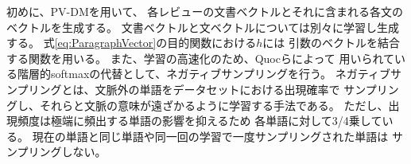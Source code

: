\documentclass{ttithesis}
\begin{document}
初めに、PV-DMを用いて、
各レビューの文書ベクトルとそれに含まれる各文のベクトルを生成する。
文書ベクトルと文ベクトルについては別々に学習し生成する。
式\ref{eq:ParagraphVector}の目的関数における$h$には
引数のベクトルを結合する関数を用いる。
また、学習の高速化のため、Quocら\cite{quoc14}によって
用いられている階層的softmaxの代替として、ネガティブサンプリングを行う。
ネガティブサンプリングとは、文脈外の単語をデータセットにおける出現確率で
サンプリングし、それらと文脈の意味が遠ざかるように学習する手法である。
ただし、出現頻度は極端に頻出する単語の影響を抑えるため
各単語に対して3/4乗している。
現在の単語と同じ単語や同一回の学習で一度サンプリングされた単語は
サンプリングしない。
\end{document}
